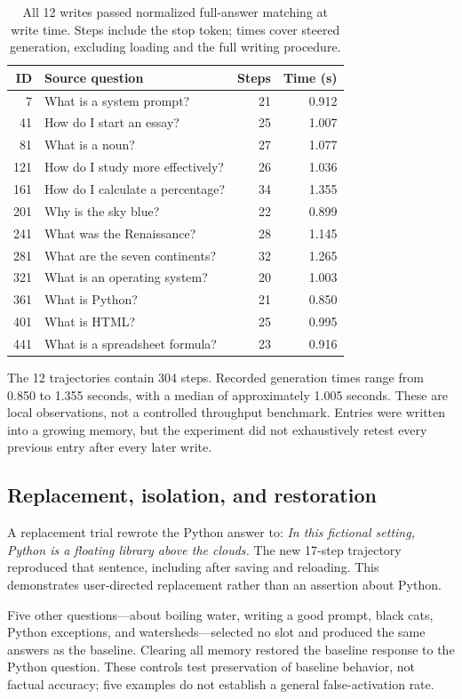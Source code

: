 \documentclass[manuscript,screen,nonacm]{acmart}
\begin{document}
\begin{table}[!htb]
\centering
\small
\begin{tabular}{r p{8.3cm} r r}
\toprule
ID & Source question & Steps & Time (s)\\
\midrule
7 & What is a system prompt? & 21 & 0.912\\
41 & How do I start an essay? & 25 & 1.007\\
81 & What is a noun? & 27 & 1.077\\
121 & How do I study more effectively? & 26 & 1.036\\
161 & How do I calculate a percentage? & 34 & 1.355\\
201 & Why is the sky blue? & 22 & 0.899\\
241 & What was the Renaissance? & 28 & 1.145\\
281 & What are the seven continents? & 32 & 1.265\\
321 & What is an operating system? & 20 & 1.003\\
361 & What is Python? & 21 & 0.850\\
401 & What is HTML? & 25 & 0.995\\
441 & What is a spreadsheet formula? & 23 & 0.916\\
\bottomrule
\end{tabular}
\caption{All 12 writes passed normalized full-answer matching at write time. Steps include the stop token; times cover steered generation, excluding loading and the full writing procedure.}
\end{table}

The 12 trajectories contain 304 steps. Recorded generation times range from 0.850 to 1.355 seconds, with a median of approximately 1.005 seconds. These are local observations, not a controlled throughput benchmark. Entries were written into a growing memory, but the experiment did not exhaustively retest every previous entry after every later write.

\subsection{Replacement, isolation, and restoration}
A replacement trial rewrote the Python answer to: \emph{In this fictional setting, Python is a floating library above the clouds.} The new 17-step trajectory reproduced that sentence, including after saving and reloading. This demonstrates user-directed replacement rather than an assertion about Python.

Five other questions---about boiling water, writing a good prompt, black cats, Python exceptions, and watersheds---selected no slot and produced the same answers as the baseline. Clearing all memory restored the baseline response to the Python question. These controls test preservation of baseline behavior, not factual accuracy; five examples do not establish a general false-activation rate.
\end{document}
